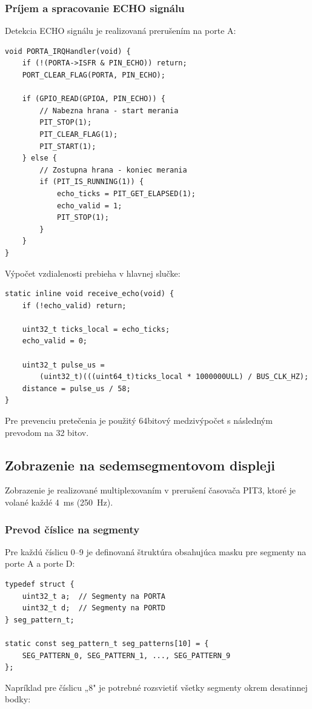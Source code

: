 \documentclass[11pt, a4paper,slovak]{article}
\begin{document}
\subsubsection{Príjem a spracovanie ECHO signálu}

Detekcia ECHO signálu je realizovaná prerušením na porte A:

\begin{lstlisting}
void PORTA_IRQHandler(void) {
    if (!(PORTA->ISFR & PIN_ECHO)) return;
    PORT_CLEAR_FLAG(PORTA, PIN_ECHO);

    if (GPIO_READ(GPIOA, PIN_ECHO)) {
        // Nabezna hrana - start merania
        PIT_STOP(1);
        PIT_CLEAR_FLAG(1);
        PIT_START(1);
    } else {
        // Zostupna hrana - koniec merania
        if (PIT_IS_RUNNING(1)) {
            echo_ticks = PIT_GET_ELAPSED(1);
            echo_valid = 1;
            PIT_STOP(1);
        }
    }
}
\end{lstlisting}
Výpočet vzdialenosti prebieha v hlavnej slučke:

\begin{lstlisting}
static inline void receive_echo(void) {
    if (!echo_valid) return;

    uint32_t ticks_local = echo_ticks;
    echo_valid = 0;

    uint32_t pulse_us = 
        (uint32_t)(((uint64_t)ticks_local * 1000000ULL) / BUS_CLK_HZ);
    distance = pulse_us / 58;
}
\end{lstlisting}
Pre prevenciu pretečenia je použitý 64bitový medzivýpočet s následným prevodom na 32 bitov.

\subsection{Zobrazenie na sedemsegmentovom displeji}

Zobrazenie je realizované multiplexovaním v prerušení časovača PIT3, ktoré je volané každé 4~ms (250~Hz).

\subsubsection{Prevod číslice na segmenty}

Pre každú číslicu 0--9 je definovaná štruktúra obsahujúca masku pre segmenty na porte A a porte D:

\begin{lstlisting}
typedef struct {
    uint32_t a;  // Segmenty na PORTA
    uint32_t d;  // Segmenty na PORTD
} seg_pattern_t;

static const seg_pattern_t seg_patterns[10] = {
    SEG_PATTERN_0, SEG_PATTERN_1, ..., SEG_PATTERN_9
};
\end{lstlisting}
Napríklad pre číslicu „8" je potrebné rozsvietiť všetky segmenty okrem desatinnej bodky:
\end{document}
